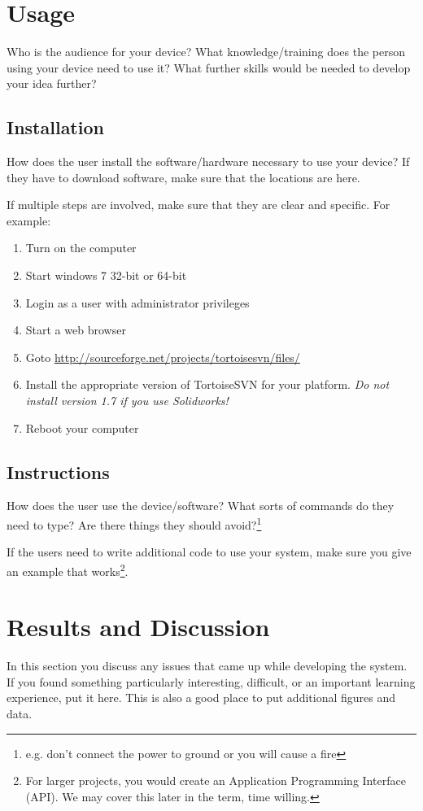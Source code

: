 \documentclass[svn, draft]{rureport}
\begin{document}
\section{Usage}

Who is the audience for your device?  What knowledge/training does
the person using your device need to use
it?  What further skills would be needed to develop your idea further?

\subsection{Installation}
How does the user install the software/hardware necessary to use your
device?  If they have to download software, make sure that the
locations are here.

If multiple steps are involved, make sure that they are clear and specific.  For example:
\begin{enumerate}
\item Turn on the computer
\item Start windows 7 32-bit or 64-bit
\item Login as a user with administrator privileges
\item Start a web browser
\item Goto \url{http://sourceforge.net/projects/tortoisesvn/files/}
\item Install the appropriate version of TortoiseSVN for your platform.  {\em Do not install version 1.7 if you use Solidworks!}
\item Reboot your computer
\end{enumerate}

\subsection{Instructions}
How does the user use the device/software?  What sorts of commands do
they need to type?  Are there things they should
avoid?\footnote{e.g. don't connect the power to ground or you will
  cause a fire}

If the users need to write additional code to use your system, make
sure you give an example that works\footnote{For larger projects, you
  would create an Application Programming Interface (API).  We may
  cover this later in the term, time willing.}.

\section{Results and Discussion}
In this section you discuss any issues that came up while developing
the system.  If you found something particularly interesting,
difficult, or an important learning experience, put it here.  This is
also a good place to put additional figures and data.
\end{document}
